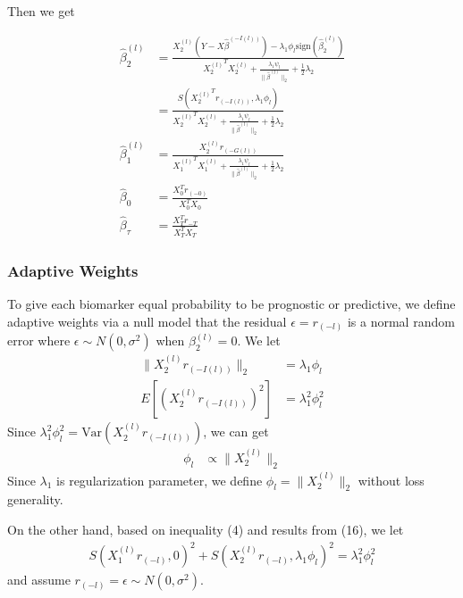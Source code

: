 \documentclass[12pt]{article}
\begin{document}
\begin{itemize}
Then we get

\begin{align}
  \hat{\beta}_2^{(l)} & =\frac{X_2^{(l)}(Y-X\hat{\beta}^{(-I(l))})-\lambda_1\phi_l\text{sign}(\hat{\beta}_2^{(l)})}{{X_2^{(l)}}^TX_2^{(l)}+\frac{\lambda_1\psi_l}{\parallel \hat{\beta}^{(l)} \parallel_2} + \frac{1}{2}\lambda_2} \\
  & = \frac{ S( {X_2^{(l)}}^Tr_{(-I(l))}, \lambda_1\phi_l ) }{ {X_2^{(l)}}^TX_2^{(l)}+\frac{\lambda_1\psi_l}{\parallel \hat{\beta}^{(l)} \parallel_2} + \frac{1}{2}\lambda_2 } \\
  \hat{\beta}_1^{(l)} & =  \frac{ X_2^{(l)}r_{(-G(l))} }{ {X_1^{(l)}}^TX_1^{(l)}+\frac{\lambda_1\psi_l}{\parallel \hat{\beta}^{(l)} \parallel_2} + \frac{1}{2}\lambda_2 } \\
  \hat{\beta}_0 & = \frac{ X_0^T r_{(-0)} }{ X_0^TX_0 } \\
  \hat{\beta}_{\tau} & = \frac{ X_T^T r_{-T} }{ X_T^TX_T }
\end{align}

\end{itemize}

\subsubsection*{Adaptive Weights}

To give each biomarker equal probability to be prognostic or predictive,
we define adaptive weights via a null model that the residual $\epsilon=r_{(-l)}$ 
is a normal random error where $\epsilon\sim N(0,\sigma^2)$ when $\beta_2^{(l)}=0$.
We let
\begin{align}
  \parallel X_2^{(l)}r_{(-I(l))} \parallel_2 & = \lambda_1\phi_l \\
  E[(X_2^{(l)}r_{(-I(l))})^2] & = \lambda_1^2\phi_l^2
\end{align}
Since $\lambda_1^2\phi_l^2 = \text{Var}(X_2^{(l)}r_{(-I(l))})$, we can get
\begin{align}
  \phi_l & \propto \parallel X_2^{(l)} \parallel_2 
\end{align}
Since $\lambda_1$ is regularization parameter, we define $\phi_l=\parallel X_2^{(l)} \parallel_2$
without loss generality.

On the other hand, based on inequality (4) and results from (16), we let
\begin{align}
  S(X_1^{(l)}r_{(-l)},0)^2+S(X_2^{(l)}r_{(-l)},\lambda_1\phi_l)^2= \lambda_1^2\phi_l^2
\end{align}
and assume $ r_{(-l)} = \epsilon  \sim N(0,\sigma^2)$.
 
\end{document}

